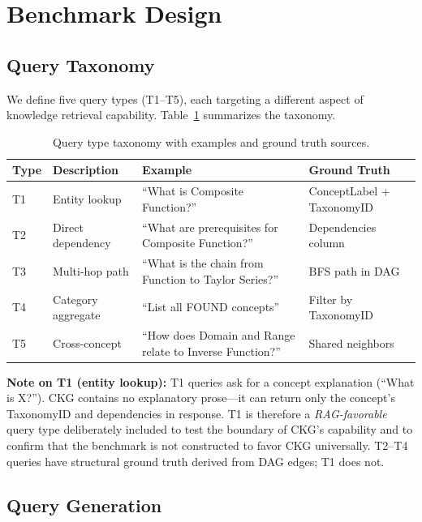 \section{Benchmark Design}\label{sec:benchmark}

\subsection{Query Taxonomy}\label{sec:query-taxonomy}

We define five query types (T1--T5), each targeting a different aspect of
knowledge retrieval capability. Table~\ref{tab:query-types} summarizes the
taxonomy.

\begin{table}[htbp]
\centering
\caption{Query type taxonomy with examples and ground truth sources.}
\label{tab:query-types}
\begin{tabular}{lp{3.5cm}p{4.5cm}l}
\toprule
\textbf{Type} & \textbf{Description} & \textbf{Example} & \textbf{Ground Truth} \\
\midrule
T1 & Entity lookup & ``What is Composite Function?'' & ConceptLabel + TaxonomyID \\
T2 & Direct dependency & ``What are prerequisites for Composite Function?'' & Dependencies column \\
T3 & Multi-hop path & ``What is the chain from Function to Taylor Series?'' & BFS path in DAG \\
T4 & Category aggregate & ``List all FOUND concepts'' & Filter by TaxonomyID \\
T5 & Cross-concept & ``How does Domain and Range relate to Inverse Function?'' & Shared neighbors \\
\bottomrule
\end{tabular}

\vspace{4pt}
\noindent\small\textbf{Note on T1 (entity lookup):} T1 queries ask for a concept explanation
(``What is X?''). CKG contains no explanatory prose---it can return only the
concept's TaxonomyID and dependencies in response. T1 is therefore a
\emph{RAG-favorable} query type deliberately included to test the boundary of
CKG's capability and to confirm that the benchmark is not constructed to favor
CKG universally. T2--T4 queries have structural ground truth derived from DAG
edges; T1 does not.
\end{table}

\subsection{Query Generation}\label{sec:query-gen}

